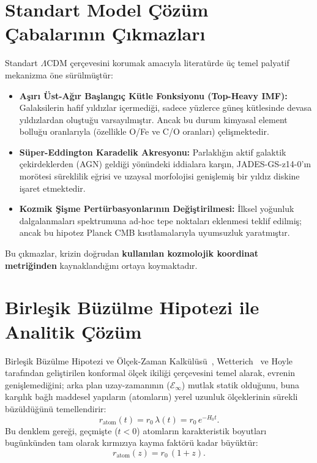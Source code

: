 \documentclass[11pt,a4paper]{article}
\begin{document}
\section{Standart Model Çözüm Çabalarının Çıkmazları}
\label{sec:standart_cikmaz}

Standart $\Lambda$CDM çerçevesini korumak amacıyla literatürde üç temel palyatif mekanizma öne sürülmüştür:
\begin{itemize}
    \item \textbf{Aşırı Üst-Ağır Başlangıç Kütle Fonksiyonu (Top-Heavy IMF):} Galaksilerin hafif yıldızlar içermediği, sadece yüzlerce güneş kütlesinde devasa yıldızlardan oluştuğu varsayılmıştır. Ancak bu durum kimyasal element bolluğu oranlarıyla (özellikle O/Fe ve C/O oranları) çelişmektedir.
    \item \textbf{Süper-Eddington Karadelik Akresyonu:} Parlaklığın aktif galaktik çekirdeklerden (AGN) geldiği yönündeki iddialara karşın, JADES-GS-z14-0'ın morötesi süreklilik eğrisi ve uzaysal morfolojisi genişlemiş bir yıldız diskine işaret etmektedir.
    \item \textbf{Kozmik Şişme Pertürbasyonlarının Değiştirilmesi:} İlksel yoğunluk dalgalanmaları spektrumuna ad-hoc tepe noktaları eklenmesi teklif edilmiş; ancak bu hipotez Planck CMB kısıtlamalarıyla uyumsuzluk yaratmıştır.
\end{itemize}

Bu çıkmazlar, krizin doğrudan \textbf{kullanılan kozmolojik koordinat metriğinden} kaynaklandığını ortaya koymaktadır.

\section{Birleşik Büzülme Hipotezi ile Analitik Çözüm}
\label{sec:buzulme_cozumu}

Birleşik Büzülme Hipotezi ve Ölçek-Zaman Kalkülüsü~\cite{haydari_main, haydari_scale}, Wetterich~\cite{wetterich2013} ve Hoyle~\cite{hoyle1964} tarafından geliştirilen konformal ölçek ikiliği çerçevesini temel alarak, evrenin genişlemediğini; arka plan uzay-zamanının ($\mathcal{E}_\infty$) mutlak statik olduğunu, buna karşılık bağlı maddesel yapıların (atomların) yerel uzunluk ölçeklerinin sürekli büzüldüğünü temellendirir:
\begin{equation}
    r_{\mathrm{atom}}(t) = r_0 \, \lambda(t) = r_0 \, e^{-H_0 t}.
    \label{eq:atom_buzulme}
\end{equation}
Bu denklem gereği, geçmişte ($t < 0$) atomların karakteristik boyutları bugünkünden tam olarak kırmızıya kayma faktörü kadar büyüktür:
\begin{equation}
    r_{\mathrm{atom}}(z) = r_0 \, (1 + z).
    \label{eq:gecmis_atom_boyutu}
\end{equation}
\end{document}
